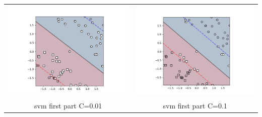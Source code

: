 \documentclass{article}
\begin{document}
\begin{tabular}{c|c}
\includegraphics[scale=0.4]{hw3images/svmfirstpartc=0d01.png}&\includegraphics[scale=0.4]{hw3images/svmfirstpartc=0d1.png}\\
{svm first part C=0.01}&{svm first part C=0.1}\\

\end{tabular}
\end{document}
